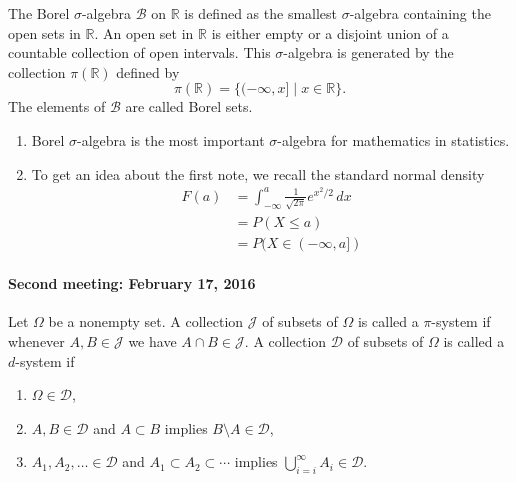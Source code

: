 \begin{example}\label{eg:1}
The Borel $\sigma$-algebra $\mathcal B$ on $\mathbb{R}$ is defined as the smallest $\sigma$-algebra
containing the open sets in $\mathbb R$. An open set in $\mathbb R$ is either empty or a disjoint 
union of a countable collection of open intervals. This $\sigma$-algebra is generated by the 
collection $\pi(\mathbb R)$ defined by
\begin{equation}
\pi(\mathbb R)=\{(-\infty, x] \mid x\in \mathbb R \}.
\end{equation}
The elements of $\mathcal B$ are called Borel sets.
\end{example}

\begin{notes}
\begin{enumerate}[label=\arabic*.]
\item Borel $\sigma$-algebra is the most important $\sigma$-algebra for mathematics in statistics.
\item To get an idea about the first note, we recall the standard normal density
\begin{align*}
F(a)&=\int_{-\infty}^{a}\frac{1}{\sqrt{2\pi}}e^{x^2/2}\, dx\\
 &=P(X\leq a)\\
 &=P(X\in (-\infty,a])
\end{align*}
\end{enumerate}
\end{notes}

\paragraph{Second meeting: February 17, 2016}

\begin{definition}
Let $\Omega$ be a nonempty set. A collection $\mathcal J$ of subsets of $\Omega$ is called a 
$\pi$-system if whenever $A,B\in \mathcal J$ we have $A\cap B\in \mathcal J$. A collection $\mathcal D$ of 
subsets of $\Omega$ is called a $d$-system if
\begin{enumerate}[label=\roman*.]
\item $\Omega \in \mathcal D$,
\item $A, B\in\mathcal D$ and $A\subset B$ implies $B\setminus A\in \mathcal D$,
\item $A_1, A_2,\ldots \in \mathcal D$ and $A_1\subset A_2\subset \cdots$ implies $\bigcup_{i=i}^\infty A_i\in \mathcal D$.
\end{enumerate}
\end{definition}

